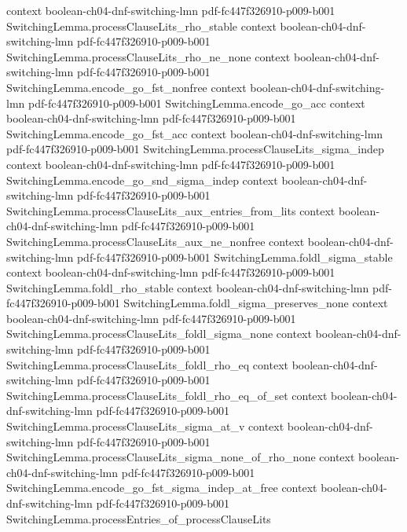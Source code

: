 \begin{theorem}
  {context}
  {boolean-ch04-dnf-switching-lmn}
  {pdf-fc447f326910-p009-b001}
\proofstep
  {SwitchingLemma.processClauseLits_rho_stable}
  {context}
  {boolean-ch04-dnf-switching-lmn}
  {pdf-fc447f326910-p009-b001}
\proofstep
  {SwitchingLemma.processClauseLits_rho_ne_none}
  {context}
  {boolean-ch04-dnf-switching-lmn}
  {pdf-fc447f326910-p009-b001}
\proofstep
  {SwitchingLemma.encode_go_fst_nonfree}
  {context}
  {boolean-ch04-dnf-switching-lmn}
  {pdf-fc447f326910-p009-b001}
\proofstep
  {SwitchingLemma.encode_go_acc}
  {context}
  {boolean-ch04-dnf-switching-lmn}
  {pdf-fc447f326910-p009-b001}
\proofstep
  {SwitchingLemma.encode_go_fst_acc}
  {context}
  {boolean-ch04-dnf-switching-lmn}
  {pdf-fc447f326910-p009-b001}
\proofstep
  {SwitchingLemma.processClauseLits_sigma_indep}
  {context}
  {boolean-ch04-dnf-switching-lmn}
  {pdf-fc447f326910-p009-b001}
\proofstep
  {SwitchingLemma.encode_go_snd_sigma_indep}
  {context}
  {boolean-ch04-dnf-switching-lmn}
  {pdf-fc447f326910-p009-b001}
\proofstep
  {SwitchingLemma.processClauseLits_aux_entries_from_lits}
  {context}
  {boolean-ch04-dnf-switching-lmn}
  {pdf-fc447f326910-p009-b001}
\proofstep
  {SwitchingLemma.processClauseLits_aux_ne_nonfree}
  {context}
  {boolean-ch04-dnf-switching-lmn}
  {pdf-fc447f326910-p009-b001}
\proofstep
  {SwitchingLemma.foldl_sigma_stable}
  {context}
  {boolean-ch04-dnf-switching-lmn}
  {pdf-fc447f326910-p009-b001}
\proofstep
  {SwitchingLemma.foldl_rho_stable}
  {context}
  {boolean-ch04-dnf-switching-lmn}
  {pdf-fc447f326910-p009-b001}
\proofstep
  {SwitchingLemma.foldl_sigma_preserves_none}
  {context}
  {boolean-ch04-dnf-switching-lmn}
  {pdf-fc447f326910-p009-b001}
\proofstep
  {SwitchingLemma.processClauseLits_foldl_sigma_none}
  {context}
  {boolean-ch04-dnf-switching-lmn}
  {pdf-fc447f326910-p009-b001}
\proofstep
  {SwitchingLemma.processClauseLits_foldl_rho_eq}
  {context}
  {boolean-ch04-dnf-switching-lmn}
  {pdf-fc447f326910-p009-b001}
\proofstep
  {SwitchingLemma.processClauseLits_foldl_rho_eq_of_set}
  {context}
  {boolean-ch04-dnf-switching-lmn}
  {pdf-fc447f326910-p009-b001}
\proofstep
  {SwitchingLemma.processClauseLits_sigma_at_v}
  {context}
  {boolean-ch04-dnf-switching-lmn}
  {pdf-fc447f326910-p009-b001}
\proofstep
  {SwitchingLemma.processClauseLits_sigma_none_of_rho_none}
  {context}
  {boolean-ch04-dnf-switching-lmn}
  {pdf-fc447f326910-p009-b001}
\proofstep
  {SwitchingLemma.encode_go_fst_sigma_indep_at_free}
  {context}
  {boolean-ch04-dnf-switching-lmn}
  {pdf-fc447f326910-p009-b001}
\proofstep
  {SwitchingLemma.processEntries_of_processClauseLits}

\end{theorem}
